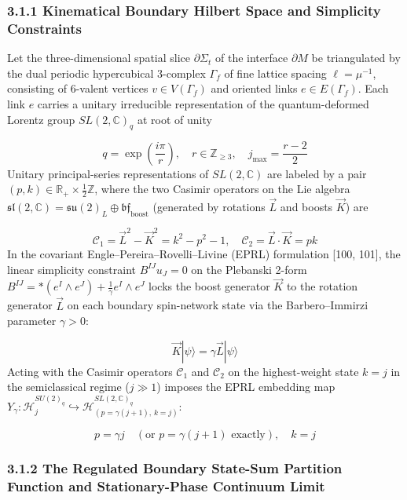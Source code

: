 \documentclass[aps,prd,onecolumn,superscriptaddress,nofootinbib,longbibliography,10pt]{revtex4-2}
\begin{document}
{{  
\subsubsection*{3.1.1 Kinematical Boundary Hilbert Space and Simplicity Constraints}

  Let the three-dimensional spatial slice \(\partial\Sigma_t\) of the interface \(\partial M\) be triangulated by the dual periodic hypercubical 3-complex \(\Gamma_f\) of fine lattice spacing \(\ell = \mu^{-1}\), consisting of 6-valent vertices \(v \in V(\Gamma_f)\) and oriented links \(e \in E(\Gamma_f)\). Each link \(e\) carries a unitary irreducible representation of the quantum-deformed Lorentz group \(SL(2,\mathbb{C})_q\) at root of unity


  \[ q = \exp\left(\frac{i\pi}{r}\right), \quad r \in \mathbb{Z}_{\ge 3}, \quad j_{\max} = \frac{r - 2}{2} \]
  Unitary principal-series representations of \(SL(2,\mathbb{C})\) are labeled by a pair \((p,k) \in \mathbb{R}_+ \times \frac{1}{2}\mathbb{Z}\), where the two Casimir operators on the Lie algebra \(\mathfrak{sl}(2,\mathbb{C}) = \mathfrak{su}(2)_L \oplus \mathfrak{bf}_{\text{boost}}\) (generated by rotations \(\vec{L}\) and boosts \(\vec{K}\)) are


  \[ \mathcal{C}_1 = \vec{L}^2 - \vec{K}^2 = k^2 - p^2 - 1, \quad \mathcal{C}_2 = \vec{L}\cdot\vec{K} = pk \]
  In the covariant Engle–Pereira–Rovelli–Livine (EPRL) formulation [100, 101], the linear simplicity constraint \(B^{IJ}u_J = 0\) on the Plebanski 2-form \(B^{IJ} = *(e^I \wedge e^J) + \frac{1}{\gamma}e^I \wedge e^J\) locks the boost generator \(\vec{K}\) to the rotation generator \(\vec{L}\) on each boundary spin-network state via the Barbero–Immirzi parameter \(\gamma > 0\):


  \[ \vec{K}|\psi\rangle = \gamma\vec{L}|\psi\rangle \]
  Acting with the Casimir operators \(\mathcal{C}_1\) and \(\mathcal{C}_2\) on the highest-weight state \(k = j\) in the semiclassical regime (\(j \gg 1\)) imposes the EPRL embedding map \(Y_\gamma : \mathcal{H}_j^{SU(2)_q} \hookrightarrow \mathcal{H}_{(p=\gamma(j+1),\,k=j)}^{SL(2,\mathbb{C})_q}\):


  \[ p = \gamma j \quad (\text{or } p = \gamma(j+1)\text{ exactly}), \quad k = j \]

  
\subsubsection*{3.1.2 The Regulated Boundary State-Sum Partition Function and Stationary-Phase Continuum Limit}

}}
\end{document}
